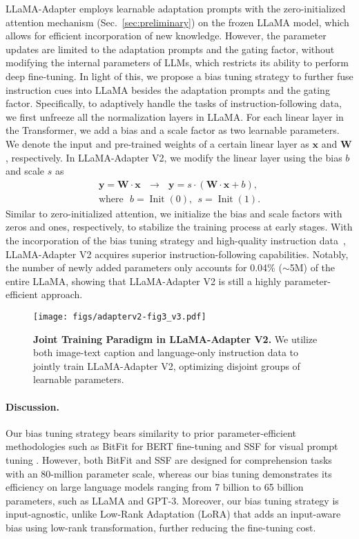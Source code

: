 \documentclass[10pt,twocolumn,letterpaper]{article}
\begin{document}
LLaMA-Adapter employs learnable adaptation prompts with the zero-initialized attention mechanism (Sec.~\ref{sec:preliminary}) on the frozen LLaMA model, which allows for efficient incorporation of new knowledge. However, the parameter updates are limited to the adaptation prompts and the gating factor, without modifying the internal parameters of LLMs, which restricts its ability to perform deep fine-tuning.
In light of this, we propose a bias tuning strategy to further fuse instruction cues into LLaMA besides the adaptation prompts and the gating factor.
Specifically, to adaptively handle the tasks of instruction-following data, we first unfreeze all the normalization layers in LLaMA. For each linear layer in the Transformer, we add a bias and a scale factor as two learnable parameters. We denote the input and pre-trained weights of a certain linear layer as $\mathbf{x}$ and $\mathbf{W}$, respectively. In LLaMA-Adapter V2, we modify the linear layer using the bias $b$ and scale $s$ as
\begin{align}
    \mathbf{y} = \mathbf{W\cdot x}\ \ \ \rightarrow\ \ \ \mathbf{y} = s\cdot (\mathbf{W\cdot x} + b),\\
    \text{where}\ \ \ b = \operatorname{Init}(0), \ \ s = \operatorname{Init}(1).
\end{align}
Similar to zero-initialized attention, we initialize the bias and scale factors with zeros and ones, respectively, to stabilize the training process at early stages.
With the incorporation of the bias tuning strategy and high-quality instruction data~\cite{peng2023instruction}, LLaMA-Adapter V2 acquires superior instruction-following capabilities. Notably, the number of newly added parameters only accounts for 0.04\% ($\sim$5M) of the entire LLaMA, showing that LLaMA-Adapter V2 is still a highly parameter-efficient approach. 


\begin{figure*}[t!]
    \centering
\texttt{[image: figs/adapterv2-fig3\_v3.pdf]}
    \caption{\textbf{Joint Training Paradigm in LLaMA-Adapter V2.} We utilize both image-text caption and language-only instruction data to jointly train LLaMA-Adapter V2, optimizing disjoint groups of learnable parameters.}
    \label{fig22}
\end{figure*}



\paragraph{Discussion.} Our bias tuning strategy bears similarity to prior parameter-efficient methodologies such as BitFit \cite{zaken2021bitfit} for BERT fine-tuning and SSF \cite{lian2022scaling} for visual prompt tuning \cite{jia2022visual}. 
However, both BitFit and SSF are designed for comprehension tasks with an 80-million parameter scale, whereas our bias tuning demonstrates its efficiency on large language models ranging from 7 billion to 65 billion parameters, such as LLaMA and GPT-3.
Moreover, our bias tuning strategy is input-agnostic, unlike Low-Rank Adaptation (LoRA) that adds an input-aware bias using low-rank transformation, further reducing the fine-tuning cost.
\end{document}
